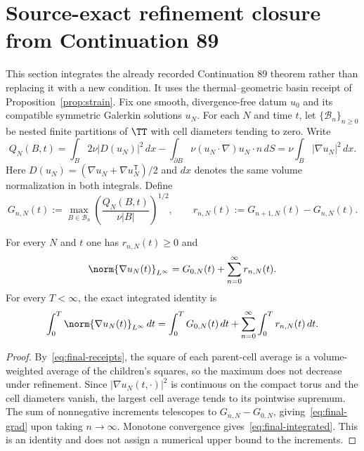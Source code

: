 \section{Source-exact refinement closure from Continuation 89}\label{sec:source89}
This section integrates the already recorded Continuation 89 theorem rather than replacing it with a new condition. It uses the thermal--geometric basin receipt of Proposition~\ref{prop:strain}. Fix one smooth, divergence-free datum $u_0$ and its compatible symmetric Galerkin solutions $u_N$. For each $N$ and time $t$, let $\{\mathcal B_n\}_{n\ge0}$ be nested finite partitions of $\TT$ with cell diameters tending to zero. Write
\begin{equation}\label{eq:final-receipts}
Q_N(B,t)=\int_B2\nu|D(u_N)|^2\,dx-\int_{\partial B}\nu(u_N\cdot\nabla)u_N\cdot n\,dS
=\nu\int_B|\nabla u_N|^2\,dx.
\end{equation}
Here $D(u_N)=(\nabla u_N+\nabla u_N^{\mathsf T})/2$ and $dx$ denotes the same volume normalization in both integrals. Define
\begin{equation}\label{eq:final-gn}
G_{n,N}(t):=\max_{B\in\mathcal B_n}\left(\frac{Q_N(B,t)}{\nu|B|}\right)^{1/2},\qquad
r_{n,N}(t):=G_{n+1,N}(t)-G_{n,N}(t).
\end{equation}
\begin{theorem}\label{thm:final-refinement}
For every $N$ and $t$ one has $r_{n,N}(t)\ge0$ and
\begin{equation}\label{eq:final-grad}
\norm{\nabla u_N(t)}_{L^\infty}
=G_{0,N}(t)+\sum_{n=0}^\infty r_{n,N}(t).
\end{equation}
For every $T<\infty$, the exact integrated identity is
\begin{equation}\label{eq:final-integrated}
\int_0^T\norm{\nabla u_N(t)}_{L^\infty}\,dt
=\int_0^T G_{0,N}(t)\,dt+\sum_{n=0}^\infty\int_0^T r_{n,N}(t)\,dt.
\end{equation}
\end{theorem}
\begin{proof}
By~\eqref{eq:final-receipts}, the square of each parent-cell average is a volume-weighted average of the children's squares, so the maximum does not decrease under refinement. Since $|\nabla u_N(t,\cdot)|^2$ is continuous on the compact torus and the cell diameters vanish, the largest cell average tends to its pointwise supremum. The sum of nonnegative increments telescopes to $G_{n,N}-G_{0,N}$, giving~\eqref{eq:final-grad} upon taking $n\to\infty$. Monotone convergence gives~\eqref{eq:final-integrated}. This is an identity and does not assign a numerical upper bound to the increments.
\end{proof}
